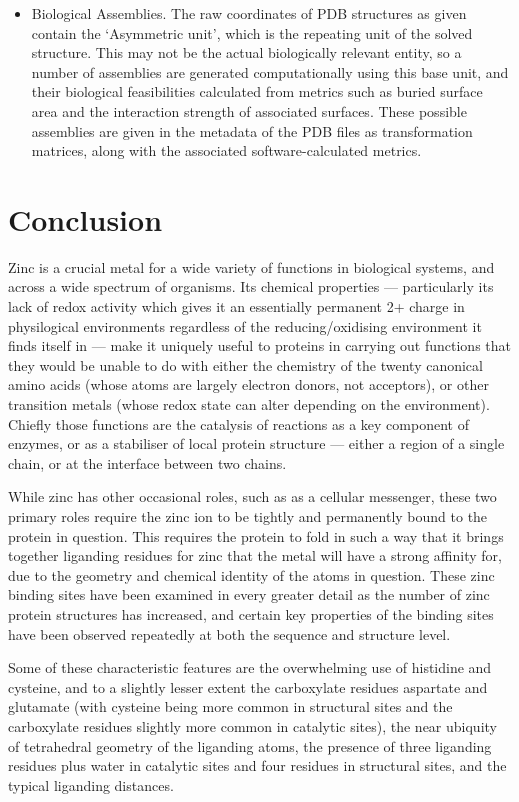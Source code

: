 \begin{itemize}
\item Biological Assemblies. The raw coordinates of PDB structures as given contain the `Asymmetric unit', which is the repeating unit of the solved structure. This may not be the actual biologically relevant entity, so a number of assemblies are generated computationally using this base unit, and their biological feasibilities calculated from metrics such as buried surface area and the interaction strength of associated surfaces. These possible assemblies are given in the metadata of the PDB files as transformation matrices, along with the associated software-calculated metrics.
\end{itemize}

\section{Conclusion}

Zinc is a crucial metal for a wide variety of functions in biological systems, and across a wide spectrum of organisms. Its chemical properties --- particularly its lack of redox activity which gives it an essentially permanent 2+ charge in physilogical environments regardless of the reducing/oxidising environment it finds itself in --- make it uniquely useful to proteins in carrying out functions that they would be unable to do with either the chemistry of the twenty canonical amino acids (whose atoms are largely electron donors, not acceptors), or other transition metals (whose redox state can alter depending on the environment). Chiefly those functions are the catalysis of reactions as a key component of enzymes, or as a stabiliser of local protein structure --- either a region of a single chain, or at the interface between two chains.

While zinc has other occasional roles, such as as a cellular messenger, these two primary roles require the zinc ion to be tightly and permanently bound to the protein in question. This requires the protein to fold in such a way that it brings together liganding residues for zinc that the metal will have a strong affinity for, due to the geometry and chemical identity of the atoms in question. These zinc binding sites have been examined in every greater detail as the number of zinc protein structures has increased, and certain key properties of the binding sites have been observed repeatedly at both the sequence and structure level.

Some of these characteristic features are the overwhelming use of histidine and cysteine, and to a slightly lesser extent the carboxylate residues aspartate and glutamate (with cysteine being more common in structural sites and the carboxylate residues slightly more common in catalytic sites), the near ubiquity of tetrahedral geometry of the liganding atoms, the presence of three liganding residues plus water in catalytic sites and four residues in structural sites, and the typical liganding distances.


